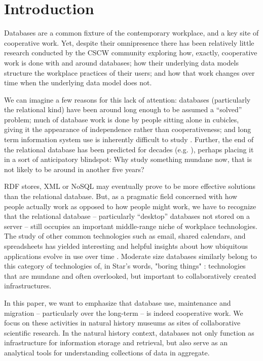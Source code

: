 \section{Introduction}

Databases are a common fixture of the contemporary workplace, and a key site of cooperative work. Yet, despite their omnipresence there has been relatively little research conducted by the CSCW community exploring how, exactly, cooperative work is done with and around databases;  how their underlying data models structure the workplace practices of their users; and how that work changes over time when the underlying data model does not. 

We can imagine a few reasons for this lack of attention: databases (particularly the relational kind) have been around long enough to be assumed a “solved” problem; much of database work is done by people sitting alone in cubicles, giving it the appearance of independence rather than cooperativeness; and long term information system use is inherently difficult to study \cite{Pipek_2002}. Further, the end of the relational database has been predicted for decades (e.g. \cite{Atzeni_2013}), perhaps placing it in a sort of anticipatory blindspot: Why study something mundane now, that is not likely to be around in another five years? 

RDF stores, XML or NoSQL may eventually prove to be more effective solutions than the relational database. But, as a pragmatic field concerned with how people actually work as opposed to how people might work, we have to recognize that the relational database – particularly “desktop” databases not stored on a server – still occupies an important middle-range niche of workplace technologies. The study of other common technologies such as email, shared calendars, and spreadsheets has yielded interesting and helpful insights about how ubiquitous applications evolve in use over time \cite{bellotti2005quality, palen1999social, nardi1991twinkling}. Moderate size databases similarly belong to this category of technologies of, in Star's words, "boring things" \cite{star1999ethnography}: technologies that are mundane and often overlooked, but important to collaboratively created infrastructures.  

In this paper, we want to emphasize that database use, maintenance and migration – particularly over the long-term – is indeed cooperative work. We focus on these activities in natural history museums as sites of collaborative scientific research. In the natural history context, databases not only function as infrastructure for information storage and retrieval, but also serve as an analytical tools for understanding collections of data in aggregate. 

